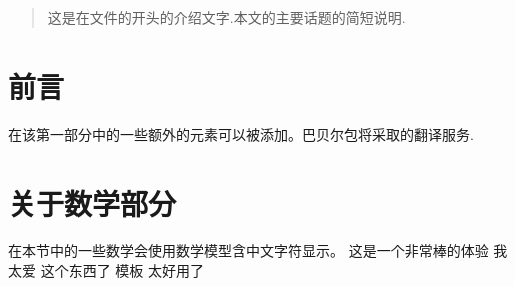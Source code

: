 \documentclass{article}
\begin{document}
\tableofcontents

\begin{abstract}
这是在文件的开头的介绍文字.本文的主要话题的简短说明.
\end{abstract}

\section{ 前言 }
在该第一部分中的一些额外的元素可以被添加。巴贝尔包将采取的翻译服务.

\section{关于数学部分}
在本节中的一些数学会使用数学模型含中文字符显示。
这是一个非常棒的体验
我太爱 这个东西了 模板
太好用了
\end{document}
